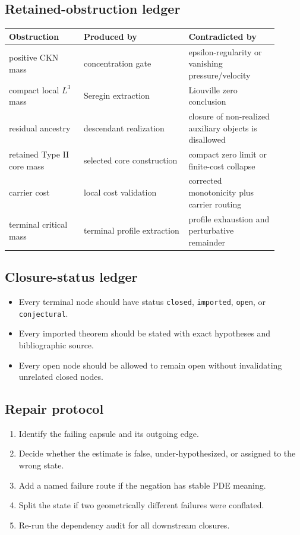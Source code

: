 \documentclass[11pt]{article}
\theoremstyle{plain}
\theoremstyle{definition}
\theoremstyle{remark}
\begin{document}
\subsection{Retained-obstruction ledger}
\begin{center}
\begin{longtable}{p{0.25\linewidth}p{0.35\linewidth}p{0.30\linewidth}}
\toprule
Obstruction & Produced by & Contradicted by \\
\midrule
positive CKN mass & concentration gate & epsilon-regularity or vanishing pressure/velocity \\
compact local $L^3$ mass & Seregin extraction & Liouville zero conclusion \\
residual ancestry & descendant realization & closure of non-realized auxiliary objects is disallowed \\
retained Type II core mass & selected core construction & compact zero limit or finite-cost collapse \\
carrier cost & local cost validation & corrected monotonicity plus carrier routing \\
terminal critical mass & terminal profile extraction & profile exhaustion and perturbative remainder \\
\bottomrule
\end{longtable}
\end{center}

\subsection{Closure-status ledger}
\begin{itemize}
  \item Every terminal node should have status \texttt{closed}, \texttt{imported}, \texttt{open}, or \texttt{conjectural}.
  \item Every imported theorem should be stated with exact hypotheses and bibliographic source.
  \item Every open node should be allowed to remain open without invalidating unrelated closed nodes.
\end{itemize}

\subsection{Repair protocol}
\begin{enumerate}
  \item Identify the failing capsule and its outgoing edge.
  \item Decide whether the estimate is false, under-hypothesized, or assigned to the wrong state.
  \item Add a named failure route if the negation has stable PDE meaning.
  \item Split the state if two geometrically different failures were conflated.
  \item Re-run the dependency audit for all downstream closures.
\end{enumerate}
\end{document}
